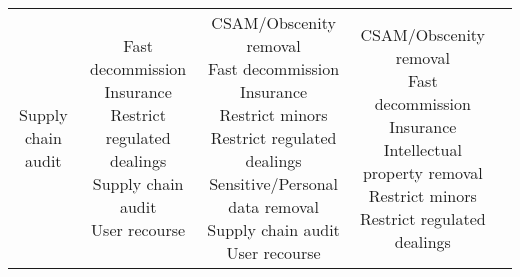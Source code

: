 \documentclass[fleqn]{article}
\begin{document}
\begin{landscape}
\begin{table}[H]
\begin{tabular}{|c|c|c|c|c|}
{			\textbullet\hspace{3pt} Supply chain audit \\ 							 	 
		} 
		& \makecell[l]{
			\textbullet\hspace{3pt} Fast decommission \\ 	
			\textbullet\hspace{3pt} Insurance \\ 	
			\textbullet\hspace{3pt} Restrict regulated dealings \\ 		
			\textbullet\hspace{3pt} Supply chain audit \\ 	
			\textbullet\hspace{3pt} User recourse \\  						 	 
		}
		& \makecell[l]{
			\textbullet\hspace{3pt} CSAM/Obscenity removal \\ 	
			\textbullet\hspace{3pt} Fast decommission \\ 	
			\textbullet\hspace{3pt} Insurance \\ 	
			\textbullet\hspace{3pt} Restrict minors \\ 	
			\textbullet\hspace{3pt} Restrict regulated dealings \\ 	
			\textbullet\hspace{3pt} Sensitive/Personal data removal \\ 	
			\textbullet\hspace{3pt} Supply chain audit \\ 	
			\textbullet\hspace{3pt} User recourse \\ 		 	 	 
		} 
		& \makecell[l]{
			\textbullet\hspace{3pt} CSAM/Obscenity removal \\ 	
			\textbullet\hspace{3pt} Fast decommission \\ 	
			\textbullet\hspace{3pt} Insurance \\ 	
			\textbullet\hspace{3pt} Intellectual property removal \\ 		
			\textbullet\hspace{3pt} Restrict minors \\ 	
			\textbullet\hspace{3pt} Restrict regulated dealings \\ 	
}
\end{tabular}
\end{table}
\end{landscape}
\end{document}
